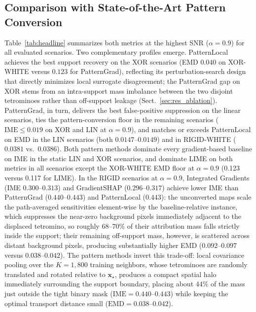 \documentclass[pdflatex,sn-mathphys-num]{sn-jnl}
\theoremstyle{thmstyleone}
\theoremstyle{thmstyletwo}%
\theoremstyle{thmstylethree}%
\begin{document}
\subsection{Comparison with State-of-the-Art Pattern Conversion}\label{sec:res_comparison}

Table~\ref{tab:headline} summarizes both metrics at the highest SNR ($\alpha = 0.9$) for all evaluated scenarios. Two complementary profiles emerge. PatternLocal achieves the best support recovery on the XOR scenarios (EMD $0.040$ on XOR-WHITE versus $0.123$ for PatternGrad), reflecting its perturbation-search design that directly minimizes local surrogate disagreement; the PatternGrad gap on XOR stems from an intra-support mass imbalance between the two disjoint tetrominoes rather than off-support leakage (Sect.~\ref{sec:res_ablation}). PatternGrad, in turn, delivers the best false-positive suppression on the linear scenarios, ties the pattern-conversion floor in the remaining scenarios ($\mathrm{IME} \le 0.019$ on XOR and LIN at $\alpha = 0.9$), and matches or exceeds PatternLocal on EMD in the LIN scenarios (both $0.0147$--$0.0149$) and in RIGID-WHITE ($0.0381$ vs.\ $0.0386$). Both pattern methods dominate every gradient-based baseline on IME in the static LIN and XOR scenarios, and dominate LIME on both metrics in all scenarios except the XOR-WHITE EMD floor at $\alpha = 0.9$ (0.123 versus 0.117 for LIME). In the RIGID scenarios at $\alpha = 0.9$, Integrated Gradients (IME $0.300$--$0.313$) and GradientSHAP ($0.296$--$0.317$) achieve lower IME than PatternGrad ($0.440$--$0.443$) and PatternLocal ($0.443$): the unconverted maps scale the path-averaged sensitivities element-wise by the baseline-relative instance, which suppresses the near-zero background pixels immediately adjacent to the displaced tetromino, so roughly $68$--$70\%$ of their attribution mass falls strictly inside the support; their remaining off-support mass, however, is scattered across distant background pixels, producing substantially higher EMD ($0.092$--$0.097$ versus $0.038$--$0.042$). The pattern methods invert this trade-off: local covariance pooling over the $K = 1{,}800$ training neighbors, whose tetrominoes are randomly translated and rotated relative to $\mathbf{x}_\star$, produces a compact spatial halo immediately surrounding the support boundary, placing about $44\%$ of the mass just outside the tight binary mask ($\mathrm{IME} = 0.440$--$0.443$) while keeping the optimal transport distance small ($\mathrm{EMD} = 0.038$--$0.042$).
\end{document}
